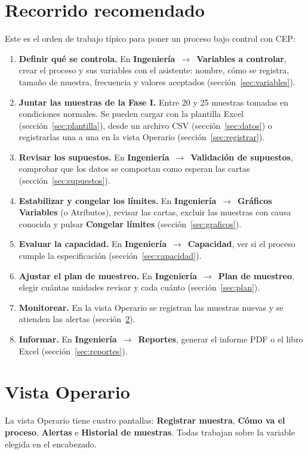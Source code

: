\documentclass[11pt,a4paper]{article}
\newcommand{\boton}[1]{\textbf{#1}}                      %
\newcommand{\ruta}[2]{\textbf{#1}~$\rightarrow$~\textbf{#2}} %
\begin{document}
\section{Recorrido recomendado}\label{sec:recorrido}
Este es el orden de trabajo típico para poner un proceso bajo control con CEP:

\begin{enumerate}[itemsep=0.45em]
\item \textbf{Definir qué se controla.} En \ruta{Ingeniería}{Variables a controlar}, crear el
  proceso y sus variables con el asistente: nombre, cómo se registra, tamaño de muestra,
  frecuencia y valores aceptados (sección~\ref{sec:variables}).
\item \textbf{Juntar las muestras de la Fase I.} Entre 20 y 25 muestras tomadas en condiciones
  normales. Se pueden cargar con la plantilla Excel (sección~\ref{sec:plantilla}), desde un archivo
  CSV (sección~\ref{sec:datos}) o registrarlas una a una en la vista Operario
  (sección~\ref{sec:registrar}).
\item \textbf{Revisar los supuestos.} En \ruta{Ingeniería}{Validación de supuestos}, comprobar que
  los datos se comportan como esperan las cartas (sección~\ref{sec:supuestos}).
\item \textbf{Estabilizar y congelar los límites.} En \ruta{Ingeniería}{Gráficos Variables} (o
  Atributos), revisar las cartas, excluir las muestras con causa conocida y pulsar
  \boton{Congelar límites} (sección~\ref{sec:graficos}).
\item \textbf{Evaluar la capacidad.} En \ruta{Ingeniería}{Capacidad}, ver si el proceso cumple
  la especificación (sección~\ref{sec:capacidad}).
\item \textbf{Ajustar el plan de muestreo.} En \ruta{Ingeniería}{Plan de muestreo}, elegir cuántas
  unidades revisar y cada cuánto (sección~\ref{sec:plan}).
\item \textbf{Monitorear.} En la vista Operario se registran las muestras nuevas y se atienden las
  alertas (sección~\ref{sec:operario}).
\item \textbf{Informar.} En \ruta{Ingeniería}{Reportes}, generar el informe PDF o el libro Excel
  (sección~\ref{sec:reportes}).
\end{enumerate}

\section{Vista Operario}\label{sec:operario}
La vista Operario tiene cuatro pantallas: \boton{Registrar muestra}, \boton{Cómo va el proceso},
\boton{Alertas} e \boton{Historial de muestras}. Todas trabajan sobre la variable elegida en el
encabezado.
\end{document}
